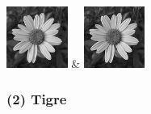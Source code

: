 \begin{table}[h!]
\begin{tabular}
        \includegraphics[width=2cm]{images/processed/flower/gaussian_5x5_sigma1.0/unblurred_15-iter.png} &
        \includegraphics[width=2cm]{images/processed/flower/gaussian_5x5_sigma2.0/unblurred_15-iter.png}                                                                                                                                                                                                 \\
    \end{tabular}
\end{table}

\newpage
\subsubsection*{(2) Tigre}

